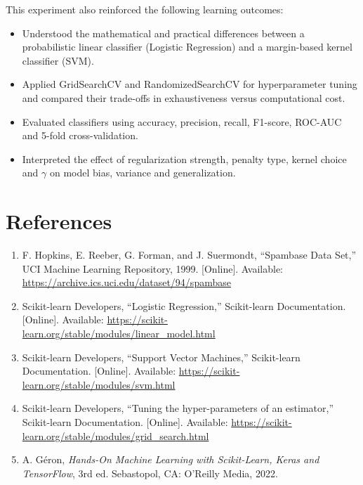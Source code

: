 \documentclass[12pt,a4paper]{article}
\begin{document}
This experiment also reinforced the following learning outcomes:
\begin{itemize}[nosep]
\item Understood the mathematical and practical differences between a probabilistic
linear classifier (Logistic Regression) and a margin-based kernel classifier (SVM).
\item Applied GridSearchCV and RandomizedSearchCV for hyperparameter tuning and compared
their trade-offs in exhaustiveness versus computational cost.
\item Evaluated classifiers using accuracy, precision, recall, F1-score, ROC-AUC and
5-fold cross-validation.
\item Interpreted the effect of regularization strength, penalty type, kernel choice and
$\gamma$ on model bias, variance and generalization.
\end{itemize}

\section{References}
\begin{enumerate}
\item F. Hopkins, E. Reeber, G. Forman, and J. Suermondt, ``Spambase Data Set,'' UCI
Machine Learning Repository, 1999. [Online]. Available:
\url{https://archive.ics.uci.edu/dataset/94/spambase}
\item Scikit-learn Developers, ``Logistic Regression,'' Scikit-learn Documentation.
[Online]. Available: \url{https://scikit-learn.org/stable/modules/linear_model.html}
\item Scikit-learn Developers, ``Support Vector Machines,'' Scikit-learn Documentation.
[Online]. Available: \url{https://scikit-learn.org/stable/modules/svm.html}
\item Scikit-learn Developers, ``Tuning the hyper-parameters of an estimator,''
Scikit-learn Documentation. [Online]. Available:
\url{https://scikit-learn.org/stable/modules/grid_search.html}
\item A. G\'eron, \textit{Hands-On Machine Learning with Scikit-Learn, Keras and
TensorFlow}, 3rd ed. Sebastopol, CA: O'Reilly Media, 2022.
\end{enumerate}
\end{document}
